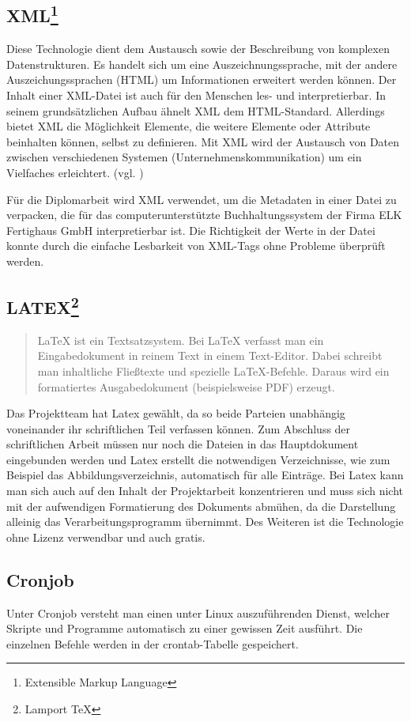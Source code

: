 \subsection[XML]{XML\footnote{Extensible Markup Language}}
\label{technologien:xml}
Diese Technologie dient dem Austausch sowie der Beschreibung von komplexen Datenstrukturen. Es handelt sich um eine Auszeichnungssprache, mit der andere Auszeichungssprachen (HTML) um Informationen erweitert werden können. Der Inhalt einer XML-Datei ist auch für den Menschen les- und interpretierbar. In seinem grundsätzlichen Aufbau ähnelt XML dem HTML-Standard. Allerdings bietet XML die Möglichkeit Elemente, die weitere Elemente oder Attribute beinhalten können, selbst zu definieren. Mit XML wird der Austausch von Daten zwischen verschiedenen Systemen (Unternehmenskommunikation) um ein Vielfaches erleichtert. (vgl. \cite{xml})

Für die Diplomarbeit wird XML verwendet, um die Metadaten in einer Datei zu verpacken, die für das computerunterstützte Buchhaltungssystem der Firma ELK Fertighaus GmbH interpretierbar ist. Die Richtigkeit der Werte in der Datei konnte durch die einfache Lesbarkeit von XML-Tags ohne Probleme überprüft werden.
\newpage
\subsection[LATEX]{LATEX\footnote{Lamport TeX}}
\begin{quote}
\glqq LaTeX ist ein Textsatzsystem. Bei LaTeX verfasst man ein Eingabedokument in reinem Text in einem Text-Editor. Dabei schreibt man inhaltliche Fließtexte und spezielle LaTeX-Befehle. Daraus wird ein formatiertes Ausgabedokument (beispielsweise PDF) erzeugt.  \cite{latex}
\end{quote}

Das Projektteam hat Latex gewählt, da so beide Parteien unabhängig voneinander ihr schriftlichen Teil verfassen können. Zum Abschluss der schriftlichen Arbeit müssen nur noch die Dateien in das Hauptdokument eingebunden werden und Latex erstellt die notwendigen Verzeichnisse, wie zum Beispiel das Abbildungsverzeichnis, automatisch für alle Einträge. Bei Latex kann man sich auch auf den Inhalt der Projektarbeit konzentrieren und muss sich nicht mit der aufwendigen Formatierung des Dokuments abmühen, da die Darstellung alleinig das Verarbeitungsprogramm übernimmt. Des Weiteren ist die Technologie ohne Lizenz verwendbar und auch gratis.

\subsection{Cronjob}
Unter Cronjob versteht man einen unter Linux auszuführenden Dienst, welcher Skripte und Programme automatisch zu einer gewissen Zeit ausführt. Die einzelnen Befehle werden in der crontab-Tabelle gespeichert.

